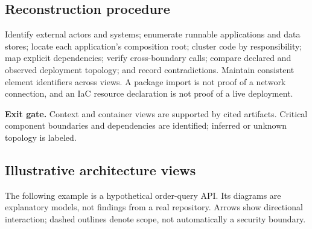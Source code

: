 \documentclass[11pt,letterpaper]{article}
\newcommand{\gate}[1]{\par\noindent\colorbox{pale}{\parbox{\dimexpr\linewidth-2\fboxsep\relax}{\textbf{\color{teal}Exit gate.} #1}}\par}
\begin{document}
\subsection{Reconstruction procedure}
Identify external actors and systems; enumerate runnable applications and data stores; locate each application's composition root; cluster code by responsibility; map explicit dependencies; verify cross-boundary calls; compare declared and observed deployment topology; and record contradictions. Maintain consistent element identifiers across views. A package import is not proof of a network connection, and an IaC resource declaration is not proof of a live deployment.
\gate{Context and container views are supported by cited artifacts. Critical component boundaries and dependencies are identified; inferred or unknown topology is labeled.}
\clearpage
\subsection{Illustrative architecture views}
The following example is a hypothetical order-query API. Its diagrams are explanatory models, not findings from a real repository. Arrows show directional interaction; dashed outlines denote scope, not automatically a security boundary.
\end{document}
